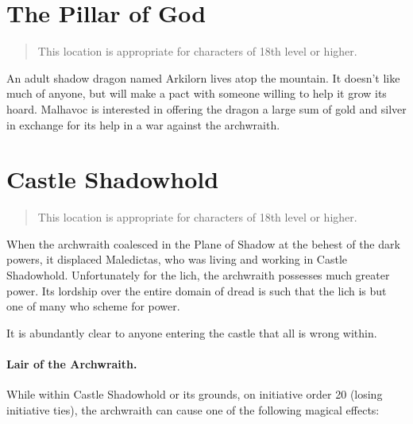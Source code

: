 \section{The Pillar of God} \label{loc:pillarofgod}

\begin{quote}
  This location is appropriate for characters of 18th level or higher.
\end{quote}

An adult shadow dragon named Arkilorn lives atop the mountain. It doesn't like
much of anyone, but will make a pact with someone willing to help it grow its hoard.
Malhavoc is interested in offering the dragon a large sum of gold and silver in
exchange for its help in a war against the archwraith.

\section{Castle Shadowhold} \label{loc:shadowhold}

\begin{quote}
  This location is appropriate for characters of 18th level or higher.
\end{quote}

When the archwraith coalesced in the Plane of Shadow at the behest of the dark powers,
it displaced Maledictas, who was living and working in Castle Shadowhold. Unfortunately
for the lich, the archwraith possesses much greater power. Its lordship over the
entire domain of dread is such that the lich is but one of many who scheme for power.

It is abundantly clear to anyone entering the castle that all is wrong within.

\paragraph{Lair of the Archwraith.} While within Castle Shadowhold or its grounds,
on initiative order 20 (losing initiative ties), the archwraith can cause one of
the following magical effects:

